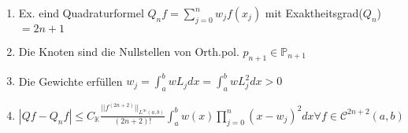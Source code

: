 \begin{theorem}
	\begin{enumerate}
		\item Ex. eind Quadraturformel $Q_nf = \sum_{j=0}^{n} w_j f(x_j)$ mit Exaktheitsgrad($Q_n$)$=2n+1$
		\item Die Knoten sind die Nullstellen von Orth.pol. $p_{n+1} \in \mathbb{P}_{n+1}$
		\item Die Gewichte erfüllen $w_j = \int_{a}^{b} wL_j dx = \int_{a}^{b} wL_j^2 dx > 0$
		\item $|Qf - Q_nf| \leq C_{\mathbb{K}} \frac{||f^{(2n+2)}||_{L^\infty(a,b)}}{(2n+2)!} \int_{a}^{b} w(x) \prod_{j=0}^{n} (x-w_j)^2 dx \forall f \in \mathcal{C}^{2n+2}(a,b)$
	\end{enumerate}
\end{theorem}

